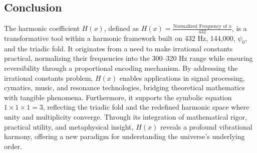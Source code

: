 \subsection{Conclusion}
\label{subsec:h_x_conclusion}
The harmonic coefficient \( H(x) \), defined as \( H(x) = \frac{\text{Normalized Frequency of } x}{432} \), is a transformative tool within a harmonic framework built on 432 Hz, 144,000, \( \psi_0 \), and the triadic fold. It originates from a need to make irrational constants practical, normalizing their frequencies into the 300--320 Hz range while ensuring reversibility through a proportional encoding mechanism. By addressing the irrational constants problem, \( H(x) \) enables applications in signal processing, cymatics, music, and resonance technologies, bridging theoretical mathematics with tangible phenomena. Furthermore, it supports the symbolic equation \( 1 \times 1 \times 1 = 3 \), reflecting the triadic fold and the redefined harmonic space where unity and multiplicity converge. Through its integration of mathematical rigor, practical utility, and metaphysical insight, \( H(x) \) reveals a profound vibrational harmony, offering a new paradigm for understanding the universe’s underlying order.